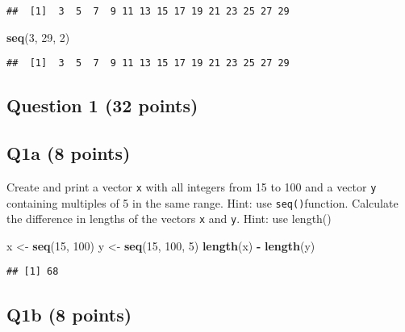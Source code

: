 \documentclass[
]{article}
\newenvironment{Shaded}{\begin{snugshade}}{\end{snugshade}}
\newcommand{\DecValTok}[1]{\textcolor[rgb]{0.00,0.00,0.81}{#1}}
\newcommand{\FunctionTok}[1]{\textcolor[rgb]{0.13,0.29,0.53}{\textbf{#1}}}
\newcommand{\NormalTok}[1]{#1}
\newcommand{\OtherTok}[1]{\textcolor[rgb]{0.56,0.35,0.01}{#1}}
\newcommand{\SpecialCharTok}[1]{\textcolor[rgb]{0.81,0.36,0.00}{\textbf{#1}}}
\begin{document}
\begin{verbatim}
##  [1]  3  5  7  9 11 13 15 17 19 21 23 25 27 29
\end{verbatim}

\begin{Shaded}
\begin{Highlighting}[]
\FunctionTok{seq}\NormalTok{(}\DecValTok{3}\NormalTok{, }\DecValTok{29}\NormalTok{, }\DecValTok{2}\NormalTok{)}
\end{Highlighting}
\end{Shaded}

\begin{verbatim}
##  [1]  3  5  7  9 11 13 15 17 19 21 23 25 27 29
\end{verbatim}

\hypertarget{question-1-32-points}{%
\subsection{Question 1 (32 points)}\label{question-1-32-points}}

\hypertarget{q1a-8-points}{%
\subsection{Q1a (8 points)}\label{q1a-8-points}}

Create and print a vector \texttt{x} with all integers from 15 to 100
and a vector \texttt{y} containing multiples of 5 in the same range.
Hint: use \texttt{seq()}function. Calculate the difference in lengths of
the vectors \texttt{x} and \texttt{y}. Hint: use length()

\begin{Shaded}
\begin{Highlighting}[]
\NormalTok{x }\OtherTok{\textless{}{-}} \FunctionTok{seq}\NormalTok{(}\DecValTok{15}\NormalTok{, }\DecValTok{100}\NormalTok{)}
\NormalTok{y }\OtherTok{\textless{}{-}} \FunctionTok{seq}\NormalTok{(}\DecValTok{15}\NormalTok{, }\DecValTok{100}\NormalTok{, }\DecValTok{5}\NormalTok{)}
\FunctionTok{length}\NormalTok{(x) }\SpecialCharTok{{-}} \FunctionTok{length}\NormalTok{(y)}
\end{Highlighting}
\end{Shaded}

\begin{verbatim}
## [1] 68
\end{verbatim}

\hypertarget{q1b-8-points}{%
\subsection{Q1b (8 points)}\label{q1b-8-points}}
\end{document}
